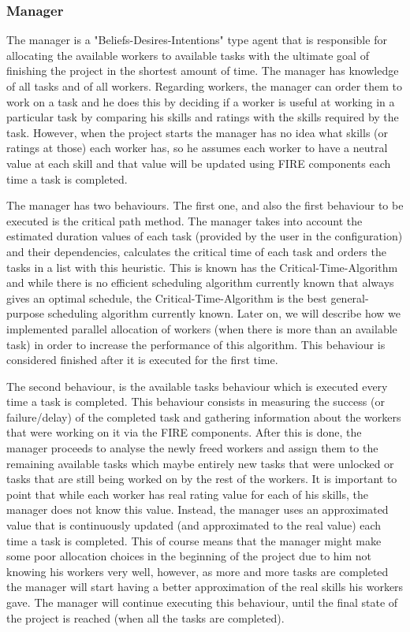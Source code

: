 \documentclass[paper=a4, fontsize=11pt]{scrartcl} %
\numberwithin{equation}{section} %
\numberwithin{figure}{section} %
\numberwithin{table}{section} %
\begin{document}
\subsubsection{Manager}
The manager is a "Beliefs-Desires-Intentions" type agent that is responsible for allocating the available workers to available tasks with the ultimate goal of finishing the project in the shortest amount of time. The manager has knowledge of all tasks and of all workers. Regarding workers, the manager can order them to work on a task and he does this by deciding if a worker is useful at working in a particular task by comparing his skills and ratings with the skills required by the task. However, when the project starts the manager has no idea what skills (or ratings at those) each worker has, so he assumes each worker to have a neutral value at each skill and that value will be updated using FIRE components each time a task is completed.

The manager has two behaviours. The first one, and also the first behaviour to be executed is the critical path method. The manager takes into account the estimated duration values of each task (provided by the user in the configuration) and their dependencies, calculates the critical time of each task and orders the tasks in a list with this heuristic. This is known has the Critical-Time-Algorithm and while there is no efficient scheduling algorithm currently known that always gives an optimal schedule, the Critical-Time-Algorithm is the best general-purpose scheduling algorithm currently known. Later on, we will describe how we implemented parallel allocation of workers (when there is more than an available task) in order to increase the performance of this algorithm. This behaviour is considered finished after it is executed for the first time.


The second behaviour, is the available tasks behaviour which is executed every time a task is completed. This behaviour consists in measuring the success (or failure/delay) of the completed task and gathering information about the workers that were working on it via the FIRE components. After this is done, the manager proceeds to analyse the newly freed workers and assign them to the remaining available tasks which maybe entirely new tasks that were unlocked or tasks that are still being worked on by the rest of the workers. It is important to point that while each worker has real rating value for each of his skills, the manager does not know this value. Instead, the manager uses an approximated value that is continuously updated (and approximated to the real value) each time a task is completed. This of course means that the manager might make some poor allocation choices in the beginning of the project due to him not knowing his workers very well, however, as more and more tasks are completed the manager will start having a better approximation of the real skills his workers gave. The manager will continue executing this behaviour, until the final state of the project is reached (when all the tasks are completed).
\end{document}

